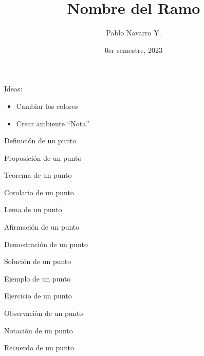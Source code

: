 \documentclass{apuntes}
\title{Nombre del Ramo}
\author{Pablo Navarro Y.}
\date{0er semestre, 2023}
\begin{document}
\renewcommand{\onlyinsubfile}[1]{}
\renewcommand{\notinsubfile}[1]{#1}

\maketitle

Ideas:
\begin{itemize}
  \item Cambiar los colores
  \item Crear ambiente ``Nota''
\end{itemize}

\begin{definicion}
  Definición de un punto
\end{definicion}

\begin{prop}
  Proposición de un punto
\end{prop}

\begin{teorema}
  Teorema de un punto
\end{teorema}

\begin{corolario}
  Corolario de un punto
\end{corolario}

\begin{lema}
  Lema de un punto
\end{lema}

\begin{aff}
  Afirmación de un punto
\end{aff}

\begin{dem}
  Demostración de un punto
\end{dem}

\begin{sol}
  Solución de un punto
\end{sol}

\begin{ejemplo}
  Ejemplo de un punto
\end{ejemplo}

\begin{ejercicio}
  Ejercicio de un punto
\end{ejercicio}

\begin{pregunta}

\end{pregunta}

\begin{obs}
  Observación de un punto
\end{obs}

\begin{notacion}
  Notación de un punto
\end{notacion}

\begin{recuerdo}
  Recuerdo de un punto
\end{recuerdo}
\end{document}
